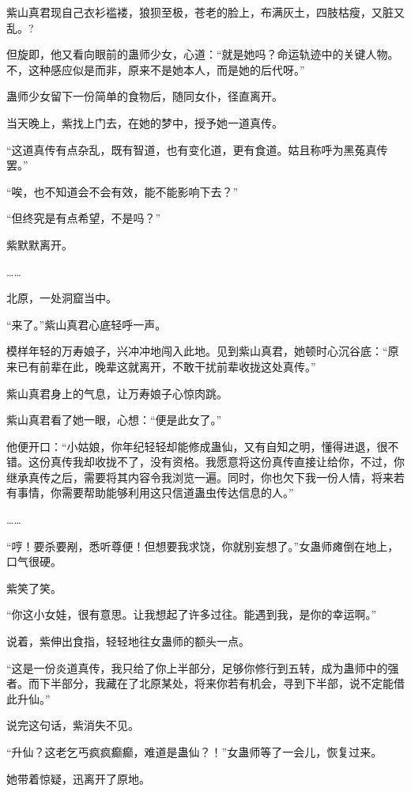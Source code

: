 
\begin{this_body}

紫山真君现自己衣衫褴褛，狼狈至极，苍老的脸上，布满灰土，四肢枯瘦，又脏又乱。?

但旋即，他又看向眼前的蛊师少女，心道：“就是她吗？命运轨迹中的关键人物。不，这种感应似是而非，原来不是她本人，而是她的后代呀。”

蛊师少女留下一份简单的食物后，随同女仆，径直离开。

当天晚上，紫找上门去，在她的梦中，授予她一道真传。

“这道真传有点杂乱，既有智道，也有变化道，更有食道。姑且称呼为黑菟真传罢。”

“唉，也不知道会不会有效，能不能影响下去？”

“但终究是有点希望，不是吗？”

紫默默离开。

……

北原，一处洞窟当中。

“来了。”紫山真君心底轻呼一声。

模样年轻的万寿娘子，兴冲冲地闯入此地。见到紫山真君，她顿时心沉谷底：“原来已有前辈在此，晚辈这就离开，不敢干扰前辈收拢这处真传。”

紫山真君身上的气息，让万寿娘子心惊肉跳。

紫山真君看了她一眼，心想：“便是此女了。”

他便开口：“小姑娘，你年纪轻轻却能修成蛊仙，又有自知之明，懂得进退，很不错。这份真传我却收拢不了，没有资格。我愿意将这份真传直接让给你，不过，你继承真传之后，需要将其内容令我浏览一遍。同时，你也欠下我一份人情，将来若有事情，你需要帮助能够利用这只信道蛊虫传达信息的人。”

……

“哼！要杀要剐，悉听尊便！但想要我求饶，你就别妄想了。”女蛊师瘫倒在地上，口气很硬。

紫笑了笑。

“你这小女娃，很有意思。让我想起了许多过往。能遇到我，是你的幸运啊。”

说着，紫伸出食指，轻轻地往女蛊师的额头一点。

“这是一份炎道真传，我只给了你上半部分，足够你修行到五转，成为蛊师中的强者。而下半部分，我藏在了北原某处，将来你若有机会，寻到下半部，说不定能借此升仙。”

说完这句话，紫消失不见。

“升仙？这老乞丐疯疯癫癫，难道是蛊仙？！”女蛊师等了一会儿，恢复过来。

她带着惊疑，迅离开了原地。


\end{this_body}

